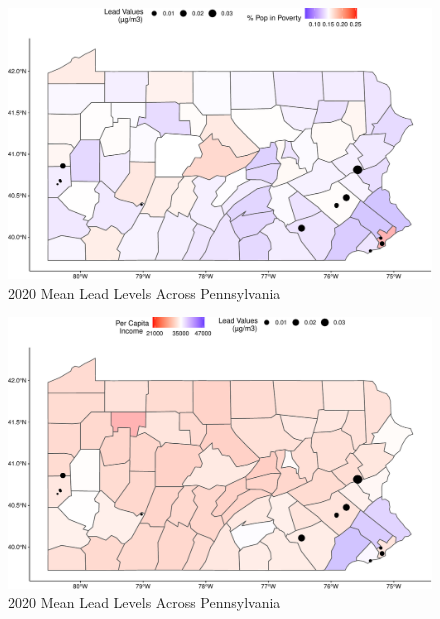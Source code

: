\documentclass[
  12pt,
]{article}
\begin{document}
\begin{figure}

\includegraphics{Alcorn_Bao_Hermanson_ENV872_Project_files/figure-latex/spatial analysis 2020.1-1} \hfill{}

\caption{2020 Mean Lead Levels Across Pennsylvania}\label{fig:spatial analysis 2020.1}
\end{figure}

\begin{figure}

\includegraphics{Alcorn_Bao_Hermanson_ENV872_Project_files/figure-latex/spatial analysis 2020.2-1} \hfill{}

\caption{2020 Mean Lead Levels Across Pennsylvania}\label{fig:spatial analysis 2020.2}
\end{figure}
\end{document}
